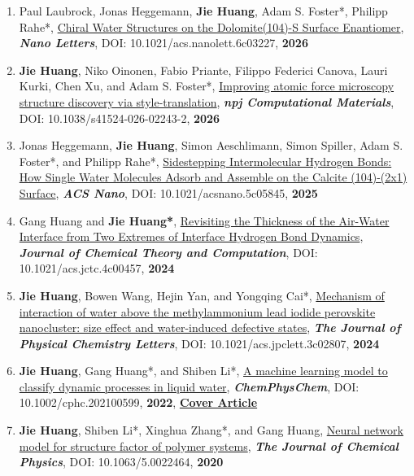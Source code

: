 \documentclass[a4paper,10pt]{article} %
\begin{document}
\begin{enumerate}
\item Paul Laubrock, Jonas Heggemann, \textbf{Jie Huang}, Adam S. Foster*, Philipp Rahe*, \href{https://way2ml.github.io/_static/publications/2026_nanoletter.pdf}{Chiral Water Structures on the Dolomite(104)-S Surface Enantiomer},   \textbf{\emph{Nano Letters}}, DOI: 10.1021/acs.nanolett.6c03227, \textbf{2026}

\item \textbf{Jie Huang}, Niko Oinonen, Fabio Priante, Filippo Federici Canova, Lauri Kurki, Chen Xu, and Adam S. Foster*, \href{https://way2ml.github.io/_static/publications/2026_npj_Comp.Matt.pdf}{Improving atomic force microscopy structure discovery via style-translation},   \textbf{\emph{npj Computational Materials}}, DOI: 10.1038/s41524-026-02243-2, \textbf{2026}

\item Jonas Heggemann, \textbf{Jie Huang}, Simon Aeschlimann, Simon Spiller, Adam S. Foster*, and Philipp Rahe*, \href{https://way2ml.github.io/_static/publications/2025_ACS_Nano.pdf}{Sidestepping Intermolecular Hydrogen Bonds: How Single Water Molecules Adsorb and Assemble on the Calcite (104)-(2x1) Surface},   \textbf{\emph{ACS Nano}}, DOI: 10.1021/acsnano.5c05845, \textbf{2025}

\item Gang Huang and \textbf{Jie Huang*}, \href{https://way2ml.github.io/_static/publications/2024_JCTC.pdf}{Revisiting the Thickness of the Air-Water Interface from Two Extremes of Interface Hydrogen Bond Dynamics},   \textbf{\emph{Journal of Chemical Theory and Computation}}, DOI: 10.1021/acs.jctc.4c00457, \textbf{2024}

\item \textbf{Jie Huang}, Bowen Wang, Hejin Yan, and Yongqing Cai*, \href{https://way2ml.github.io/_static/publications/2024_JPCL.pdf}{Mechanism of interaction of water above the methylammonium lead iodide perovskite nanocluster: size effect and water-induced defective states},   \textbf{\emph{The Journal of Physical Chemistry Letters}}, DOI: 10.1021/acs.jpclett.3c02807,  \textbf{2024}


\item \textbf{Jie Huang}, Gang Huang*, and Shiben Li*, \href{https://way2ml.github.io/_static/publications/2021_CPC.pdf}{A machine learning model to classify dynamic processes in liquid water},   \textbf{\emph{ChemPhysChem}}, DOI: 10.1002/cphc.202100599,  \textbf{2022}, \href{https://way2ml.github.io/_static/publications/2021_CPC_cover.pdf}{\textbf{Cover Article}}


\item \textbf{Jie Huang}, Shiben Li*, Xinghua Zhang*, and Gang Huang, \href{https://way2ml.github.io/_static/publications/2020_JCP.pdf}{Neural network model for structure factor of polymer systems},  \textbf{\emph{The Journal of Chemical Physics}}, DOI: 10.1063/5.0022464, \textbf{2020}
\end{enumerate}
\ 
\end{document}
